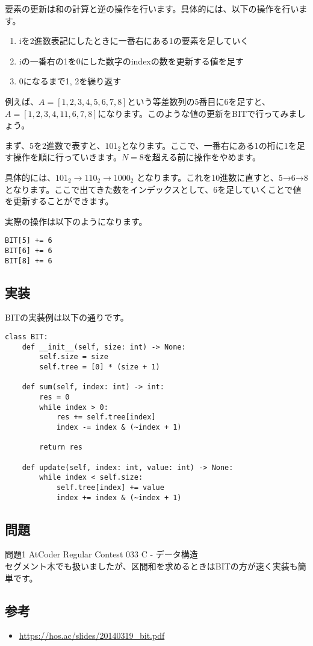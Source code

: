 \documentclass{jlreq}
\begin{document}
要素の更新は和の計算と逆の操作を行います。具体的には、以下の操作を行います。

\begin{enumerate}
	\item iを2進数表記にしたときに一番右にある1の要素を足していく
	\item iの一番右の1を0にした数字のindexの数を更新する値を足す
	\item 0になるまで1, 2を繰り返す
\end{enumerate}

例えば、$A = [1, 2, 3, 4, 5, 6, 7, 8]$という等差数列の5番目に6を足すと、$A = [1, 2, 3, 4, 11, 6, 7, 8]$になります。このような値の更新をBITで行ってみましょう。

まず、5を2進数で表すと、$101_2$となります。ここで、一番右にある1の桁に1を足す操作を順に行っていきます。$N = 8$を超える前に操作をやめます。

具体的には、$101_2 \rightarrow 110_2 \rightarrow 1000_2$ となります。これを10進数に直すと、5→6→8となります。ここで出てきた数をインデックスとして、6を足していくことで値を更新することができます。

実際の操作は以下のようになります。

\begin{verbatim}
BIT[5] += 6
BIT[6] += 6
BIT[8] += 6
\end{verbatim}

\subsection{実装}
BITの実装例は以下の通りです。

\begin{lstlisting}[caption=BITの実装, label=bit, frame=TRBL, label={bit}]
class BIT:
    def __init__(self, size: int) -> None:
        self.size = size
        self.tree = [0] * (size + 1)
    
    def sum(self, index: int) -> int:
        res = 0
        while index > 0:
            res += self.tree[index]
            index -= index & (~index + 1)
        
        return res
    
    def update(self, index: int, value: int) -> None:
        while index < self.size:
            self.tree[index] += value
            index += index & (~index + 1)
\end{lstlisting}

\subsection{問題}
\noindent 問題1 AtCoder Regular Contest 033 C - データ構造 \\
セグメント木でも扱いましたが、区間和を求めるときはBITの方が速く実装も簡単です。

\subsection{参考}
\begin{itemize}
	\item \url{https://hos.ac/slides/20140319_bit.pdf}
\end{itemize}
\end{document}
